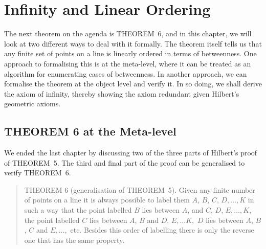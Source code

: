 \chapter{Infinity and Linear Ordering}\label{chapter:LinearOrder}
The next theorem on the agenda is THEOREM~6, and in this chapter, we will look at two different ways to deal with it formally. The theorem itself tells us that any finite set of points on a line is linearly ordered in terms of betweenness. One approach to formalising this is at the meta-level, where it can be treated as an algorithm for enumerating cases of betweenness. In another approach, we can formalise the theorem at the object level and verify it. In so doing, we shall derive the axiom of infinity, thereby showing the axiom redundant given Hilbert's geometric axioms.

\section{THEOREM 6 at the Meta-level}\label{sec:Theorem6}
We ended the last chapter by discussing two of the three parts of Hilbert's proof of THEOREM~5. The third and final part of the proof can be generalised to verify THEOREM~6.

\begin{quotation}
  THEOREM 6 (generalisation of THEOREM~5). Given any finite number of points on a line it is always possible to label them $A$, $B$, $C$, $D, \ldots, K$ in such a way that the point labelled $B$ lies between $A$, and $C$, $D$, $E, \ldots, K$, the point labelled $C$ lies between $A$, $B$ and $D$, $E,\ldots K,$ $D$ lies between $A$, $B$, $C$ and $E, \ldots,$ etc. Besides this order of labelling there is only the reverse one that has the same property.
\end{quotation}

